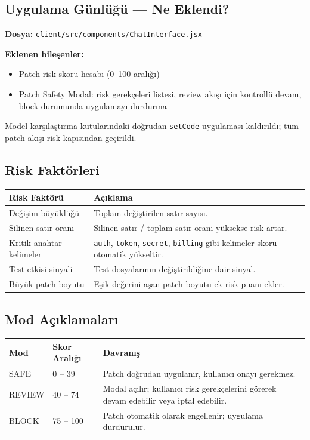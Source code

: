 \documentclass[11pt,a4paper]{article}
\begin{document}
\subsection{Uygulama Günlüğü — Ne Eklendi?}

\textbf{Dosya:} \texttt{client/src/components/ChatInterface.jsx}

\textbf{Eklenen bileşenler:}
\begin{itemize}[leftmargin=1.5em]
  \item Patch risk skoru hesabı (0--100 aralığı)
  \item Patch Safety Modal: risk gerekçeleri listesi, review akışı için kontrollü devam, block durumunda uygulamayı durdurma
\end{itemize}

\begin{warnbox}
Model karşılaştırma kutularındaki doğrudan \texttt{setCode} uygulaması kaldırıldı; tüm patch akışı risk kapısından geçirildi.
\end{warnbox}

\subsection{Risk Faktörleri}

\begin{tabularx}{\textwidth}{@{} L{4cm} X @{}}
\toprule
\textbf{Risk Faktörü} & \textbf{Açıklama} \\
\midrule
Değişim büyüklüğü & Toplam değiştirilen satır sayısı. \\
\addlinespace
Silinen satır oranı & Silinen satır / toplam satır oranı yüksekse risk artar. \\
\addlinespace
Kritik anahtar kelimeler & \texttt{auth}, \texttt{token}, \texttt{secret}, \texttt{billing} gibi kelimeler skoru otomatik yükseltir. \\
\addlinespace
Test etkisi sinyali & Test dosyalarının değiştirildiğine dair sinyal. \\
\addlinespace
Büyük patch boyutu & Eşik değerini aşan patch boyutu ek risk puanı ekler. \\
\bottomrule
\end{tabularx}

\subsection{Mod Açıklamaları}

\begin{tabularx}{\textwidth}{@{} L{2cm} L{2.5cm} X @{}}
\toprule
\textbf{Mod} & \textbf{Skor Aralığı} & \textbf{Davranış} \\
\midrule
SAFE & 0 – 39 & Patch doğrudan uygulanır, kullanıcı onayı gerekmez. \\
\addlinespace
REVIEW & 40 – 74 & Modal açılır; kullanıcı risk gerekçelerini görerek devam edebilir veya iptal edebilir. \\
\addlinespace
BLOCK & 75 – 100 & Patch otomatik olarak engellenir; uygulama durdurulur. \\
\bottomrule
\end{tabularx}
\end{document}
